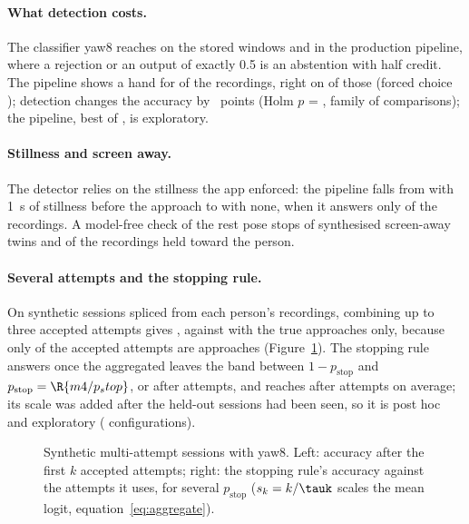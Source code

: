 \paragraph{What detection costs.} The classifier yaw8 reaches  on the stored windows and  in
the production pipeline, where a rejection or an output of exactly 0.5 is an abstention with half credit. The
pipeline shows a hand for  of the recordings, right on
 of those (forced choice ); detection changes the accuracy by
~points (Holm $p$ = , family of 
comparisons); the pipeline, best of , is exploratory.

\paragraph{Stillness and screen away.} The detector relies on the stillness the app enforced: the pipeline falls
from  with 1~s of stillness before the approach to  with
none, when it answers only  of the recordings. A model-free check of the rest pose
stops  of synthesised screen-away twins and 
of the recordings held toward the person.

\paragraph{Several attempts and the stopping rule.} On synthetic sessions spliced from each person's recordings,
combining up to three accepted attempts gives , against  with the
true approaches only, because only  of the accepted attempts are approaches
(Figure~\ref{fig:M4_04_attempts}). The stopping rule answers once the aggregated \pright{} leaves the band between
$1 - p_{\mathrm{stop}}$ and $p_{\mathrm{stop}} = \R{m4/p_stop}$, or after  attempts, and reaches
 after  attempts on average; its scale was added after the held-out sessions
had been seen, so it is post hoc and exploratory ( configurations).

\begin{figure}[htbp]
\centering
{}
\caption{Synthetic multi-attempt sessions with yaw8. Left: accuracy after the first $k$ accepted attempts; right:
the stopping rule's accuracy against the attempts it uses, for several $p_{\mathrm{stop}}$ ($s_k = k/\tauk$ scales
the mean logit, equation~\eqref{eq:aggregate}).}
\label{fig:M4_04_attempts}
\end{figure}

